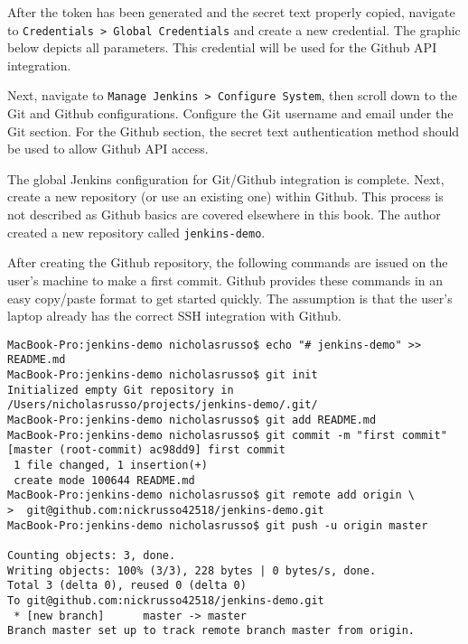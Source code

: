 
After the token has been generated and the secret text properly copied,
navigate to \verb|Credentials > Global Credentials| and create a new
credential. The graphic below depicts all parameters. This credential will be
used for the Github API integration.


Next, navigate to \verb|Manage Jenkins > Configure System|, then scroll down
to the Git and Github configurations. Configure the Git username and email
under the Git section. For the Github section, the secret text authentication
method should be used to allow Github API access.



The global Jenkins configuration for Git/Github integration is complete. Next,
create a new repository (or use an existing one) within Github. This process
is not described as Github basics are covered elsewhere in this book. The
author created a new repository called \verb|jenkins-demo|.

After creating the Github repository, the following commands are issued on the
user's machine to make a first commit. Github provides these commands in an
easy copy/paste format to get started quickly. The assumption is that the
user's laptop already has the correct SSH integration with Github.

\begin{verbatim}
MacBook-Pro:jenkins-demo nicholasrusso$ echo "# jenkins-demo" >> README.md
MacBook-Pro:jenkins-demo nicholasrusso$ git init
Initialized empty Git repository in /Users/nicholasrusso/projects/jenkins-demo/.git/
MacBook-Pro:jenkins-demo nicholasrusso$ git add README.md
MacBook-Pro:jenkins-demo nicholasrusso$ git commit -m "first commit"
[master (root-commit) ac98dd9] first commit
 1 file changed, 1 insertion(+)
 create mode 100644 README.md
MacBook-Pro:jenkins-demo nicholasrusso$ git remote add origin \
>  git@github.com:nickrusso42518/jenkins-demo.git
MacBook-Pro:jenkins-demo nicholasrusso$ git push -u origin master

Counting objects: 3, done.
Writing objects: 100% (3/3), 228 bytes | 0 bytes/s, done.
Total 3 (delta 0), reused 0 (delta 0)
To git@github.com:nickrusso42518/jenkins-demo.git
 * [new branch]      master -> master
Branch master set up to track remote branch master from origin.
\end{verbatim}

